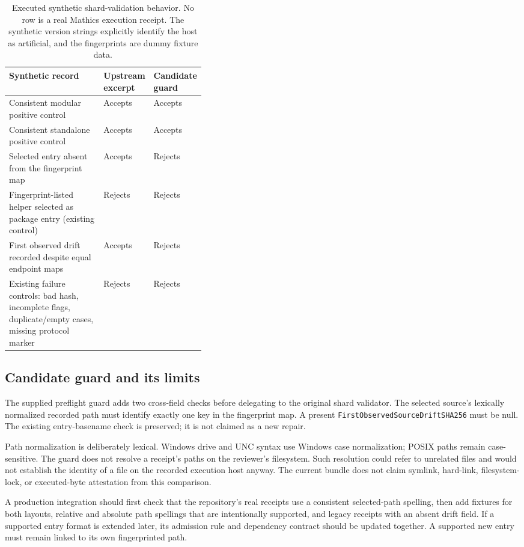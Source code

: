 \documentclass[11pt,letterpaper]{article}
\newcommand{\prop}[1]{\texttt{#1}}
\begin{document}
\begin{table}[htbp]
\small
\begin{tabularx}{\linewidth}{@{}Yp{0.19\linewidth}p{0.19\linewidth}@{}}
\toprule
Synthetic record & Upstream excerpt & Candidate guard \\
\midrule
Consistent modular positive control & Accepts & Accepts \\
Consistent standalone positive control & Accepts & Accepts \\
Selected entry absent from the fingerprint map & Accepts & Rejects \\
Fingerprint-listed helper selected as package entry (existing control) & Rejects & Rejects \\
First observed drift recorded despite equal endpoint maps & Accepts & Rejects \\
Existing failure controls: bad hash, incomplete flags, duplicate/empty cases,
missing protocol marker & Rejects & Rejects \\
\bottomrule
\end{tabularx}
\caption{Executed synthetic shard-validation behavior. No row is a real Mathics
execution receipt. The synthetic version strings explicitly identify the host as
artificial, and the fingerprints are dummy fixture data.}
\end{table}

\subsection{Candidate guard and its limits}

The supplied preflight guard adds two cross-field checks before delegating to
the original shard validator. The selected source's lexically normalized recorded
path must identify exactly one key in the fingerprint map. A present
\prop{FirstObservedSourceDriftSHA256} must be null. The existing entry-basename
check is preserved; it is not claimed as a new repair.

Path normalization is deliberately lexical. Windows drive and UNC syntax use
Windows case normalization; POSIX paths remain case-sensitive. The guard does
not resolve a receipt's paths on the reviewer's filesystem. Such resolution could
refer to unrelated files and would not establish the identity of a file on the
recorded execution host anyway. The current bundle does not claim symlink,
hard-link, filesystem-lock, or executed-byte attestation from this comparison.

A production integration should first check that the repository's real receipts
use a consistent selected-path spelling, then add fixtures for both layouts,
relative and absolute path spellings that are intentionally supported, and
legacy receipts with an absent drift field. If a supported entry format is
extended later, its admission rule and dependency contract should be updated
together. A supported new entry must remain linked to its own fingerprinted path.
\end{document}
